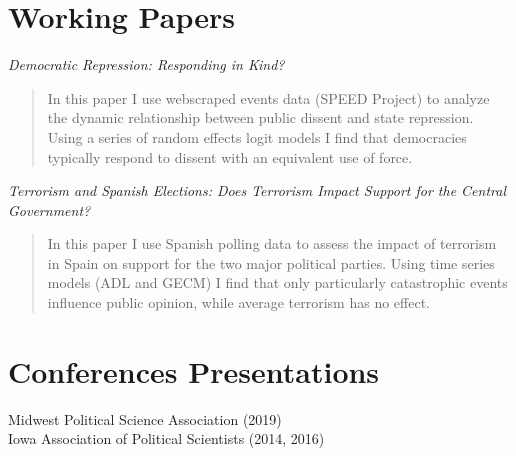 \documentclass[10pt,]{article}
\begin{document}
\section{Working Papers}\label{working-papers}

\emph{Democratic Repression: Responding in Kind?}

\begin{quote}
In this paper I use webscraped events data (SPEED Project) to analyze
the dynamic relationship between public dissent and state repression.
Using a series of random effects logit models I find that democracies
typically respond to dissent with an equivalent use of force.
\end{quote}

\emph{Terrorism and Spanish Elections: Does Terrorism Impact Support for
the Central Government?}

\begin{quote}
In this paper I use Spanish polling data to assess the impact of
terrorism in Spain on support for the two major political parties. Using
time series models (ADL and GECM) I find that only particularly
catastrophic events influence public opinion, while average terrorism
has no effect.
\end{quote}

\section{Conferences Presentations}\label{conferences-presentations}

Midwest Political Science Association (2019)\\
Iowa Association of Political Scientists (2014, 2016)
\end{document}
